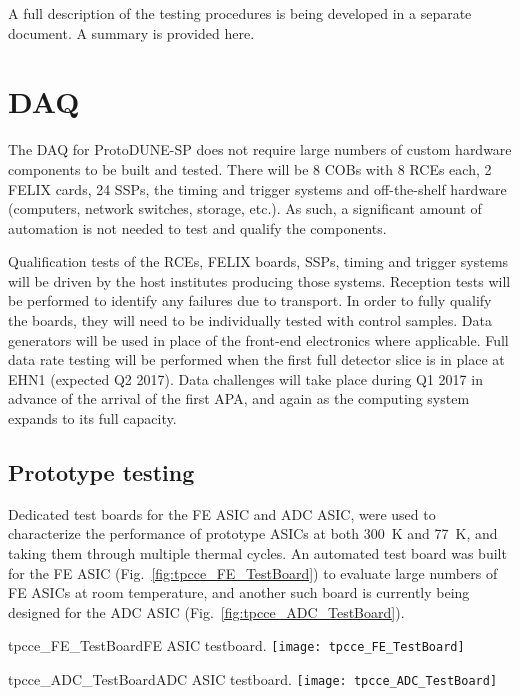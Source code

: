 A full description of the testing procedures is being developed in a separate document. A 
summary is provided here.

\section{DAQ}

The DAQ for ProtoDUNE-SP does not require large numbers of custom hardware components to 
be built and tested.  There will be 8 COBs with 8 RCEs each, 2 FELIX cards, 24 SSPs, the timing 
and trigger systems and off-the-shelf hardware (computers, network switches, storage, etc.).
As such, a significant amount of automation is not needed to test and qualify the 
components.  

Qualification tests of the RCEs, FELIX boards, SSPs, timing and trigger systems will
be driven by the host institutes producing those systems.  Reception tests will be 
performed to identify any failures due to transport.  In order to fully qualify the 
boards, they will need to be individually tested with control samples.  Data generators
will be used in place of the front-end electronics where applicable.  Full data rate 
testing will be performed when the first full detector slice is in place at EHN1 (expected
Q2 2017).  Data challenges will take place during Q1 2017 in advance of the arrival of the 
first APA, and again as the computing system expands to its full capacity.

\subsection{Prototype testing}
\label{subsubsec:ce_install_proto}

Dedicated test boards for the FE ASIC and ADC ASIC,
were used to characterize the performance of prototype ASICs at both 300~K and 77~K,
and taking them through multiple thermal cycles.
An automated test board was built for the FE ASIC (Fig.~\ref{fig:tpcce_FE_TestBoard})
to evaluate large numbers of FE ASICs at room temperature,
and another such board is currently being designed for the ADC ASIC (Fig.~\ref{fig:tpcce_ADC_TestBoard}).

\begin{cdrfigure}{tpcce_FE_TestBoard}{FE ASIC testboard.}
\texttt{[image: tpcce\_FE\_TestBoard]}
\end{cdrfigure}
\begin{cdrfigure}{tpcce_ADC_TestBoard}{ADC ASIC testboard.}
\texttt{[image: tpcce\_ADC\_TestBoard]}
\end{cdrfigure}

